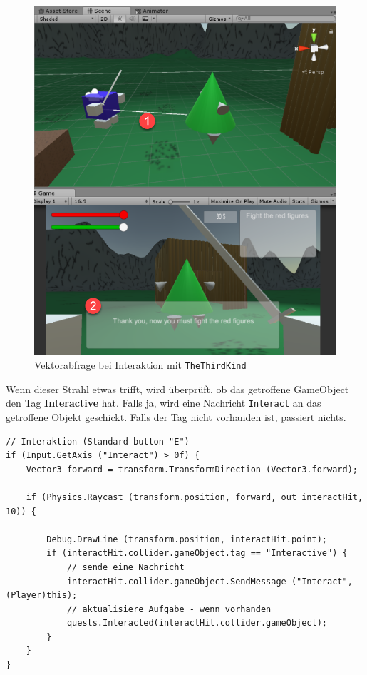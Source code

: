 \begin{figure}[H]
\includegraphics[scale=0.5]{screenshots/raycastthirdkind.png}
\caption{Vektorabfrage bei Interaktion mit \lstinline{TheThirdKind}}
\end{figure}

Wenn dieser Strahl etwas trifft, wird überprüft, ob das getroffene GameObject den Tag \textbf{Interactive} hat. Falls ja, wird eine Nachricht \lstinline{Interact} an das getroffene Objekt geschickt. Falls der Tag nicht vorhanden ist, passiert nichts.

\begin{lstlisting}[caption={Auslösen der Interaktion}]
// Interaktion (Standard button "E")
if (Input.GetAxis ("Interact") > 0f) {
	Vector3 forward = transform.TransformDirection (Vector3.forward);

	if (Physics.Raycast (transform.position, forward, out interactHit, 10)) {	
		
		Debug.DrawLine (transform.position, interactHit.point);
		if (interactHit.collider.gameObject.tag == "Interactive") {
			// sende eine Nachricht
			interactHit.collider.gameObject.SendMessage ("Interact", (Player)this);
			// aktualisiere Aufgabe - wenn vorhanden
			quests.Interacted(interactHit.collider.gameObject);
		}
	}	
}
\end{lstlisting}

